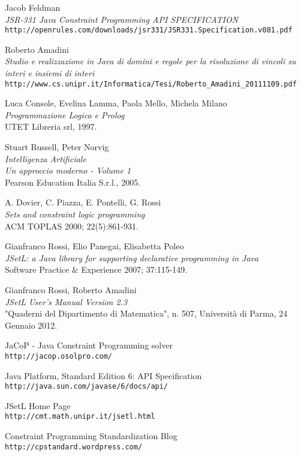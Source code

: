 \cleardoublepage
{}
{}
\begin{thebibliography}{}

 Jacob Feldman\\
        \emph{JSR-331 Java Constraint Programming API SPECIFICATION} \\
        \footnotesize \texttt{http://openrules.com/downloads/jsr331/JSR331.Specification.v081.pdf} \normalsize

 Roberto Amadini \\
	\emph{Studio e realizzazione in Java di domini e regole per la risoluzione di vincoli su interi e insiemi di interi} \\
	\footnotesize \texttt{http://www.cs.unipr.it/Informatica/Tesi/Roberto\_Amadini\_20111109.pdf} \normalsize

 Luca Console, Evelina Lamma, Paola Mello, Michela Milano \\
	\emph{Programmazione Logica e Prolog} \\
	UTET Libreria srl, 1997.

 Stuart Russell, Peter Norvig \\
	\emph{Intelligenza Artificiale \\ Un approccio moderno - Volume 1} \\
	Pearson Education Italia S.r.l., 2005.


 A. Dovier, C. Piazza, E. Pontelli, G. Rossi \\
	\emph{Sets and constraint logic programming} \\
	ACM TOPLAS 2000; 22(5):861-931.

 Gianfranco Rossi, Elio Panegai, Elisabetta Poleo \\
	\emph{JSetL: a Java library for supporting declarative programming in Java} \\
	Software Practice \& Experience 2007; 37:115-149.

 Gianfranco Rossi, Roberto Amadini \\
         \emph{JSetL User's Manual Version 2.3}\\
         "Quaderni del Dipartimento di Matematica", n. 507, Università di Parma, 24 Gennaio 2012.

 JaCoP - Java Constraint Programming solver \\
	\texttt{http://jacop.osolpro.com/}

 Java Platform, Standard Edition 6: API Specification \\
	\texttt{http://java.sun.com/javase/6/docs/api/}

 JSetL Home Page \\
	\texttt{http://cmt.math.unipr.it/jsetl.html}

  Constraint Programming Standardization Blog\\
	\texttt{http://cpstandard.wordpress.com/}


\end{thebibliography}
